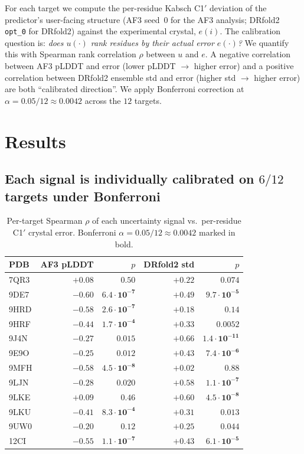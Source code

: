 \documentclass[conference,10pt]{IEEEtran}
\begin{document}
For each target we compute the per-residue Kabsch C1$'$ deviation of
the predictor's user-facing structure (AF3 seed~0 for the AF3
analysis; DRfold2 \texttt{opt\_0} for DRfold2) against the
experimental crystal, $e(i)$. The calibration question is: \emph{does
$u(\cdot)$ rank residues by their actual error $e(\cdot)$?} We
quantify this with Spearman rank correlation $\rho$ between $u$ and
$e$. A negative correlation between AF3 pLDDT and error (lower
pLDDT $\to$ higher error) and a positive correlation between
DRfold2 ensemble std and error (higher std $\to$ higher error) are
both ``calibrated direction''. We apply Bonferroni correction at
$\alpha = 0.05/12 \approx 0.0042$ across the $12$ targets.

\section{Results}

\subsection{Each signal is individually calibrated on $6/12$ targets
under Bonferroni}

\begin{table}[!t]
\centering
\renewcommand{\arraystretch}{1.1}
\caption{Per-target Spearman $\rho$ of each uncertainty signal vs.\
per-residue C1$'$ crystal error. Bonferroni $\alpha = 0.05/12 \approx
0.0042$ marked in bold.}
\label{tab:calib}
\footnotesize
\begin{tabular}{lrrrr}
\toprule
PDB & AF3 pLDDT & $p$ & DRfold2 std & $p$ \\
\midrule
7QR3 & $+0.08$ & $0.50$ & $+0.22$ & $0.074$ \\
9DE7 & $\mathbf{-0.60}$ & $\mathbf{6.4\!\cdot\!10^{-7}}$ & $\mathbf{+0.49}$ & $\mathbf{9.7\!\cdot\!10^{-5}}$ \\
9HRD & $\mathbf{-0.58}$ & $\mathbf{2.6\!\cdot\!10^{-7}}$ & $+0.18$ & $0.14$ \\
9HRF & $\mathbf{-0.44}$ & $\mathbf{1.7\!\cdot\!10^{-4}}$ & $+0.33$ & $0.0052$ \\
9J4N & $-0.27$ & $0.015$ & $\mathbf{+0.66}$ & $\mathbf{1.4\!\cdot\!10^{-11}}$ \\
9E9O & $-0.25$ & $0.012$ & $\mathbf{+0.43}$ & $\mathbf{7.4\!\cdot\!10^{-6}}$ \\
9MFH & $\mathbf{-0.58}$ & $\mathbf{4.5\!\cdot\!10^{-8}}$ & $+0.02$ & $0.88$ \\
9LJN & $-0.28$ & $0.020$ & $\mathbf{+0.58}$ & $\mathbf{1.1\!\cdot\!10^{-7}}$ \\
9LKE & $+0.09$ & $0.46$ & $\mathbf{+0.60}$ & $\mathbf{4.5\!\cdot\!10^{-8}}$ \\
9LKU & $\mathbf{-0.41}$ & $\mathbf{8.3\!\cdot\!10^{-4}}$ & $+0.31$ & $0.013$ \\
9UW0 & $-0.20$ & $0.12$ & $+0.25$ & $0.044$ \\
12CI & $\mathbf{-0.55}$ & $\mathbf{1.1\!\cdot\!10^{-7}}$ & $\mathbf{+0.43}$ & $\mathbf{6.1\!\cdot\!10^{-5}}$ \\
\bottomrule
\end{tabular}
\end{table}
\end{document}
